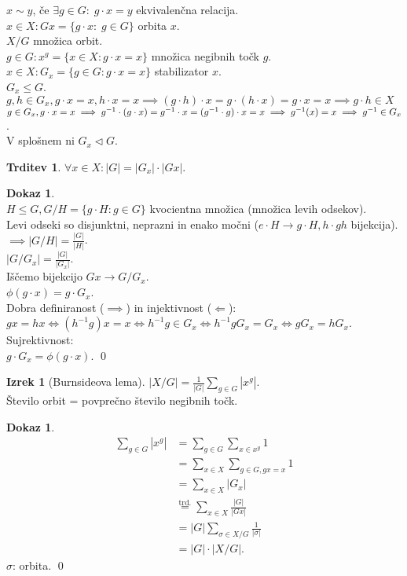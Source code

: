 \documentclass[a4paper, 12pt]{book}
\theoremstyle{definition}
\newtheorem{claim}[counter]{Trditev}
\newtheorem{theorem}[counter]{Izrek}
\newtheorem{pro}[counter]{Dokaz}
\theoremstyle{remark}
\begin{document}
$x \sim y$, če $\exists g \in G: \; g \cdot x = y$ ekvivalenčna relacija. \\
$x \in X: G x = \{g \cdot x: \; g \in G\}$ orbita $x$. \\
$X / G$ množica orbit. \\
$g \in G: x^g = \{x \in X: g \cdot x = x\}$ množica negibnih točk $g$. \\
$x \in X: G_x = \{g \in G: g \cdot x = x\}$ stabilizator $x$. \\
$G_x \leq G$. \\
$g, h \in G_x, g \cdot x = x, h \cdot x = x \implies (g \cdot h) \cdot x = g \cdot (h \cdot x) =
g \cdot x = x \implies g \cdot h \in X$ \\
$g \in G_x, g \cdot x = x \implies g^{-1} \cdot (g \cdot x) = g^{-1} \cdot x = (g^{-1} \cdot g) \cdot x = x \\
\implies g^{-1}(x) = x \implies g^{-1} \in G_x$. \\
V splošnem ni $G_x \triangleleft G$.
\begin{claim}
  $\forall x \in X: |G| = |G_x| \cdot |G x|$.
\end{claim}
\begin{pro} \text{} \\
  $H \leq G, G / H = \{g \cdot H: g \in G\}$ kvocientna množica (množica levih odsekov). \\
  Levi odseki so disjunktni, neprazni in enako močni ($e \cdot H \to g \cdot H, h \cdot g h$ bijekcija). \\
  $\implies |G / H| = \frac{|G|}{|H|}$. \\
  $|G / G_x| = \frac{|G|}{|G_x|}$. \\
  Iščemo bijekcijo $G x \to G / G_x$. \\
  $\phi(g \cdot x) = g \cdot G_x$. \\
  Dobra definiranost ($\implies$) in injektivnost ($\Longleftarrow$): \\
  $g x = h x \iff (h^{-1} g) x = x \iff h^{-1} g \in G_x \iff h^{-1} g G_x = G_x \iff g G_x = h G_x$. \\
  Sujrektivnost: \\
  $g \cdot G_x = \phi(g \cdot x)$.
  \qed
\end{pro}
\begin{theorem}[Burnsideova lema]
  $|X / G| = \frac{1}{|G|} \sum_{g \in G} \left|x^g\right|$. \\
  Število orbit = povprečno število negibnih točk.
\end{theorem}
\begin{pro}
  \begin{align*}
    \sum_{g \in G} \left|x^g\right| &= \sum_{g \in G} \sum_{x \in x^g} 1 \\
    &= \sum_{x \in X} \sum_{g \in G, gx = x} 1 \\
    &= \sum_{x \in X} |G_x| \\
    &\stackrel{\text{trd.}}{=} \sum_{x \in X} \frac{|G|}{|G x|} \\
    &= |G| \sum_{\sigma \in X / G} \frac{1}{|\sigma|} \\
    &= |G| \cdot |X / G|.
  \end{align*}
  $\sigma$: orbita.
  \qed
\end{pro}
\end{document}
